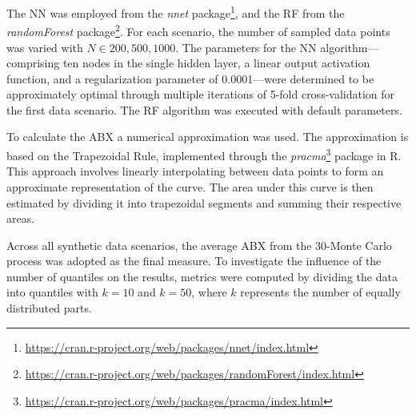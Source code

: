 The \gls{NN} was employed from the \textit{nnet} package\footnote{\url{https://cran.r-project.org/web/packages/nnet/index.html}}, and the RF from the \textit{randomForest} package\footnote{\url{https://cran.r-project.org/web/packages/randomForest/index.html}}. For each scenario, the number of sampled data points was varied with $N \in {200,500,1000}$. The parameters for the \gls{NN} algorithm—comprising ten nodes in the single hidden layer, a linear output activation function, and a regularization parameter of 0.0001—were determined to be approximately optimal through multiple iterations of 5-fold cross-validation for the first data scenario. The \gls{RF} algorithm was executed with default parameters.

To calculate the \gls{ABX} a numerical approximation was used. The approximation is based on the Trapezoidal Rule, implemented through the \textit{pracma}\footnote{\url{https://cran.r-project.org/web/packages/pracma/index.html}} package in R. This approach involves linearly interpolating between data points to form an approximate representation of the curve. The area under this curve is then estimated by dividing it into trapezoidal segments and summing their respective areas. 

Across all synthetic data scenarios, the average \gls{ABX} from the 30-Monte Carlo process was adopted as the final measure. To investigate the influence of the number of quantiles on the results, metrics were computed by dividing the data into quantiles with \(k=10\) and \(k=50\), where \(k\) represents the number of equally distributed parts.